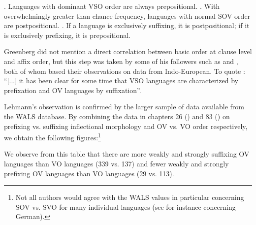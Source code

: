 \documentclass[oldfontcommands,twoside,a4paper,12pt]{article}
\begin{document}
\begin{exe}
\ex \label{ex:greenberg}
. Languages with dominant VSO order are always prepositional.
. With overwhelmingly greater than chance frequency, languages with normal SOV order are postpositional.
. If a language is exclusively suffixing, it is postpositional; if it is exclusively prefixing, it is
prepositional.
\end{exe}

Greenberg did not  mention a direct correlation between basic order at clause level and affix order, but this step was taken by some of his followers such as  \citet{vennemann74analogy} and \citet{lehmann73structural}, both of whom based their observations on data from Indo-European. To quote  \citet[23]{lehmann78typology}: ``[...]  it has been clear for some time that VSO languages are characterized by prefixation and OV languages by suffixation''.


Lehmann's observation is confirmed by the larger sample of data available from the WALS database. By combining the data in chapters 26 (\citealt{dryer11chapter26}) and 83 (\citealt{dryer11ov}) on prefixing vs. suffixing inflectional morphology and OV vs. VO order respectively, we obtain the following figures:\footnote{Not all authors would agree with the WALS values in particular concerning SOV vs. SVO for  many individual languages (see for instance \citealt{plank09wals} concerning German). }

\begin{table}[H]

\caption{Correlation between OV order and prefixing vs. suffixing inflectional morphology (data from WALS); each row in the table adds up to 100\%} \label{tab:wals}
\end{table}
We observe from this table that there are more weakly and strongly suffixing OV languages than VO languages (339 vs. 137) and fewer weakly and strongly prefixing OV languages than VO languages (29 vs. 113). 
\end{document}
